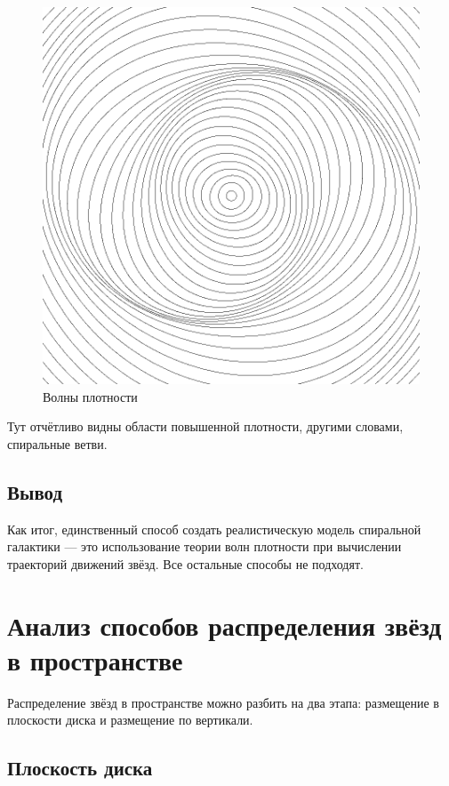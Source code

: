 \begin{figure}[H]
    \centering
	\includegraphics[scale=0.4]{image/densitywaves.png}
	\caption{Волны плотности}
	\label{img:densitywaves}
\end{figure}

Тут отчётливо видны области повышенной плотности, другими словами, спиральные ветви.

\subsection{Вывод}

Как итог, единственный способ создать реалистическую модель спиральной галактики — это использование теории волн плотности при вычислении траекторий движений звёзд. Все остальные способы не подходят.

\section{Анализ способов распределения звёзд в пространстве}

Распределение звёзд в пространстве можно разбить на два этапа: размещение в плоскости диска и размещение по вертикали.

\subsection{Плоскость диска}

